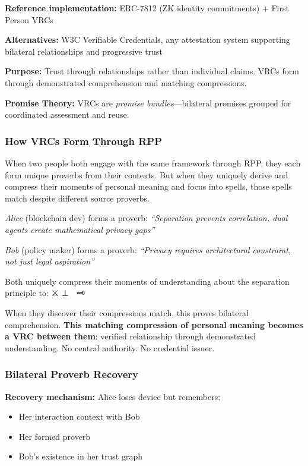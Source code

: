 \documentclass[
]{article}
\begin{document}
\textbf{Reference implementation:} ERC-7812 (ZK identity commitments) +
First Person VRCs

\textbf{Alternatives:} W3C Verifiable Credentials, any attestation
system supporting bilateral relationships and progressive trust

\textbf{Purpose:} Trust through relationships rather than individual
claims. VRCs form through demonstrated comprehension and matching
compressions.

\textbf{Promise Theory:} VRCs are \emph{promise bundles}---bilateral
promises grouped for coordinated assessment and reuse.

\subsubsection{How VRCs Form Through
RPP}\label{how-vrcs-form-through-rpp}

When two people both engage with the same framework through RPP, they
each form unique proverbs from their contexts. But when they uniquely
derive and compress their moments of personal meaning and focus into
spells, those spells match despite different source proverbs.

\emph{Alice} (blockchain dev) forms a proverb: \emph{``Separation
prevents correlation, dual agents create mathematical privacy gaps''}

\emph{Bob} (policy maker) forms a proverb: \emph{``Privacy requires
architectural constraint, not just legal aspiration''}

Both uniquely compress their moments of understanding about the
separation principle to: ⚔️ ⊥ 🧙 \textbar{} 🗝️

When they discover their compressions match, this proves bilateral
comprehension. \textbf{This matching compression of personal meaning
becomes a VRC between them}: verified relationship through demonstrated
understanding. No central authority. No credential issuer.

\subsubsection{Bilateral Proverb
Recovery}\label{bilateral-proverb-recovery}

\textbf{Recovery mechanism:} Alice loses device but remembers:

\begin{itemize}
\item
  Her interaction context with Bob
\item
  Her formed proverb
\item
  Bob's existence in her trust graph
\end{itemize}
\end{document}
